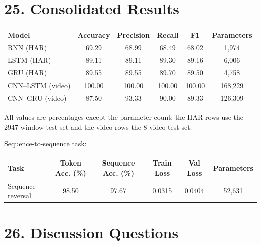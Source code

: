 \documentclass[10pt]{article}
\begin{document}
\section*{25. Consolidated Results}

\begin{center}
\begin{tabular}{|l|c|c|c|c|c|}
\hline
Model & Accuracy & Precision & Recall & F1 & Parameters\\
\hline
RNN (HAR) & 69.29 & 68.99 & 68.49 & 68.02 & 1,974\\
LSTM (HAR) & 89.11 & 89.11 & 89.30 & 89.16 & 6,006\\
GRU (HAR) & 89.55 & 89.55 & 89.70 & 89.50 & 4,758\\
CNN--LSTM (video) & 100.00 & 100.00 & 100.00 & 100.00 & 168,229\\
CNN--GRU (video) & 87.50 & 93.33 & 90.00 & 89.33 & 126,309\\
\hline
\end{tabular}
\end{center}

All values are percentages except the parameter count; the HAR rows use the 2947-window test set and the video rows the 8-video test set.

Sequence-to-sequence task:

\begin{center}
\begin{tabular}{|l|c|c|c|c|c|}
\hline
Task & Token Acc. (\%) & Sequence Acc. (\%) & Train Loss & Val Loss & Parameters\\
\hline
Sequence reversal & 98.50 & 97.67 & 0.0315 & 0.0404 & 52,631\\
\hline
\end{tabular}
\end{center}

\section*{26. Discussion Questions}
\end{document}
